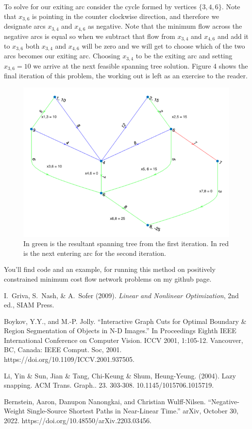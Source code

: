 \documentclass[12pt]{amsart}
\begin{document}
    To solve for our exiting arc consider the cycle formed by vertices $\{3, 4, 6\}$. Note that $x_{3, 6}$ is pointing in the counter clockwise direction, and therefore we designate 
    arcs $x_{3, 4}$ and $x_{4, 6}$ as negative. Note that the minimum flow across the negative arcs is equal so when we subtract that flow from $x_{3, 4}$ and $x_{4, 6}$ and 
    add it to $x_{3, 6}$ both $x_{3, 4}$ and $x_{4, 6}$ will be zero and we will get to choose which of the two arcs becomes our exiting arc. 
    Choosing $x_{3, 4}$ to be the exiting arc and setting $x_{3, 6} = 10$ we arrive at the next feasible spanning tree solution. Figure 4 shows the final iteration of this problem, the working out is 
    left as an exercise to the reader.   
    \begin{figure}
        \includegraphics[width=.80\textwidth]{step2.png}  %
        \caption{In green is the resultant spanning tree from the first iteration. In red is the next entering arc for the second iteration.}
        \end{figure}

    You'll find code and an example, for running this method on positively constrained minimum cost flow network problems on my github page. 


\begin{thebibliography}{2}  %
I.~Griva, S.~Nash, \& A.~Sofer (2009).
\textit{Linear and Nonlinear Optimization},
2nd ed., SIAM Press.

Boykov, Y.Y., and M.-P. Jolly. “Interactive Graph Cuts for Optimal Boundary \& Region Segmentation of Objects in N-D Images.” In Proceedings Eighth IEEE International Conference on Computer Vision. ICCV 2001, 1:105-12. Vancouver, BC, Canada: IEEE Comput. Soc, 2001. https://doi.org/10.1109/ICCV.2001.937505.

Li, Yin \& Sun, Jian \& Tang, Chi-Keung \& Shum, Heung-Yeung. (2004). Lazy snapping. ACM Trans. Graph.. 23. 303-308. 10.1145/1015706.1015719. 

Bernstein, Aaron, Danupon Nanongkai, and Christian Wulff-Nilsen. “Negative-Weight Single-Source Shortest Paths in Near-Linear Time.” arXiv, October 30, 2022. https://doi.org/10.48550/arXiv.2203.03456.

\end{thebibliography}
\end{document}

